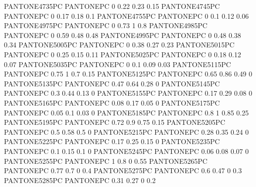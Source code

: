  {PANTONE4735PC} {PANTONE\SpotSpace PC} {0 0.22 0.23 0.15}
 {PANTONE4745PC} {PANTONE\SpotSpace PC} {0 0.17 0.18 0.1}
 {PANTONE4755PC} {PANTONE\SpotSpace PC} {0 0.1 0.12 0.06}
 {PANTONE4975PC} {PANTONE\SpotSpace PC} {0 0.73 1 0.8}
 {PANTONE4985PC} {PANTONE\SpotSpace PC} {0 0.59 0.48 0.48}
 {PANTONE4995PC} {PANTONE\SpotSpace PC} {0 0.48 0.38 0.34}
 {PANTONE5005PC} {PANTONE\SpotSpace PC} {0 0.38 0.27 0.23}
 {PANTONE5015PC} {PANTONE\SpotSpace PC} {0 0.25 0.15 0.11}
 {PANTONE5025PC} {PANTONE\SpotSpace PC} {0 0.18 0.12 0.07}
 {PANTONE5035PC} {PANTONE\SpotSpace PC} {0 0.1 0.09 0.03}
 {PANTONE5115PC} {PANTONE\SpotSpace PC} {0.75 1 0.7 0.15}
 {PANTONE5125PC} {PANTONE\SpotSpace PC} {0.65 0.86 0.49 0}
 {PANTONE5135PC} {PANTONE\SpotSpace PC} {0.47 0.64 0.28 0}
 {PANTONE5145PC} {PANTONE\SpotSpace PC} {0.3 0.44 0.13 0}
 {PANTONE5155PC} {PANTONE\SpotSpace PC} {0.17 0.29 0.08 0}
 {PANTONE5165PC} {PANTONE\SpotSpace PC} {0.08 0.17 0.05 0}
 {PANTONE5175PC} {PANTONE\SpotSpace PC} {0.05 0.1 0.03 0}
 {PANTONE5185PC} {PANTONE\SpotSpace PC} {0.8 1 0.85 0.25}
 {PANTONE5195PC} {PANTONE\SpotSpace PC} {0.72 0.9 0.75 0.15}
 {PANTONE5205PC} {PANTONE\SpotSpace PC} {0.5 0.58 0.5 0}
 {PANTONE5215PC} {PANTONE\SpotSpace PC} {0.28 0.35 0.24 0}
 {PANTONE5225PC} {PANTONE\SpotSpace PC} {0.17 0.25 0.15 0}
 {PANTONE5235PC} {PANTONE\SpotSpace PC} {0.1 0.15 0.1 0}
 {PANTONE5245PC} {PANTONE\SpotSpace PC} {0.06 0.08 0.07 0}
 {PANTONE5255PC} {PANTONE\SpotSpace PC} {1 0.8 0 0.55}
 {PANTONE5265PC} {PANTONE\SpotSpace PC} {0.77 0.7 0 0.4}
 {PANTONE5275PC} {PANTONE\SpotSpace PC} {0.6 0.47 0 0.3}
 {PANTONE5285PC} {PANTONE\SpotSpace PC} {0.31 0.27 0 0.2}
